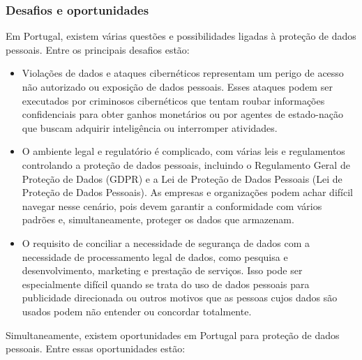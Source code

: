 \subsubsection{Desafios e oportunidades}

Em Portugal, existem várias questões e possibilidades ligadas à proteção de dados pessoais. Entre os principais desafios estão:

\begin{itemize}
  \item Violações de dados e ataques cibernéticos representam um perigo de acesso não autorizado ou exposição de dados pessoais. Esses ataques podem ser executados por criminosos cibernéticos que tentam roubar informações confidenciais para obter ganhos monetários ou por agentes de estado-nação que buscam adquirir inteligência ou interromper atividades.
  \item O ambiente legal e regulatório é complicado, com várias leis e regulamentos controlando a proteção de dados pessoais, incluindo o Regulamento Geral de Proteção de Dados (GDPR) e a Lei de Proteção de Dados Pessoais (Lei de Proteção de Dados Pessoais). As empresas e organizações podem achar difícil navegar nesse cenário, pois devem garantir a conformidade com vários padrões e, simultaneamente, proteger os dados que armazenam.
  \item O requisito de conciliar a necessidade de segurança de dados com a necessidade de processamento legal de dados, como pesquisa e desenvolvimento, marketing e prestação de serviços. Isso pode ser especialmente difícil quando se trata do uso de dados pessoais para publicidade direcionada ou outros motivos que as pessoas cujos dados são usados podem não entender ou concordar totalmente.
\end{itemize}

Simultaneamente, existem oportunidades em Portugal para proteção de dados pessoais. Entre essas oportunidades estão:


